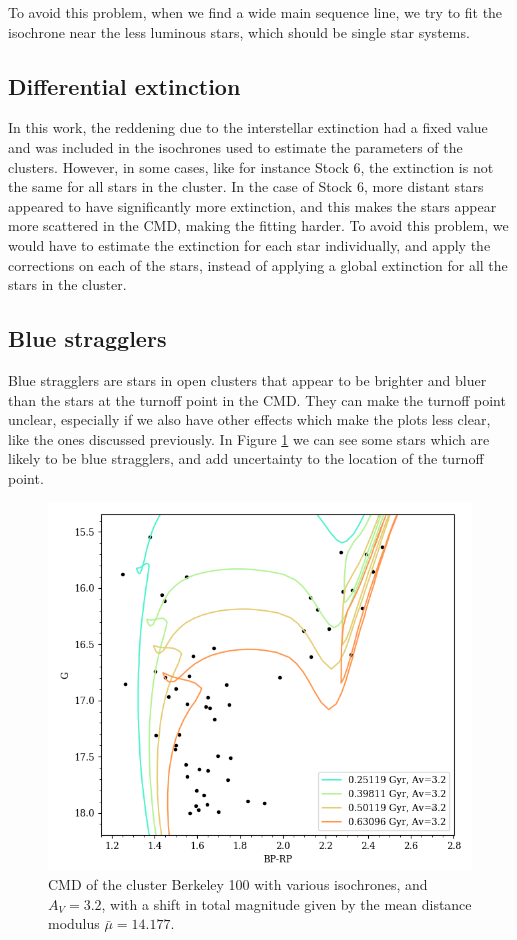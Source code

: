 \documentclass[twocolumn]{revtex4}
\begin{document}
To avoid this problem, when we find a wide main sequence line, we try to fit the isochrone near the less luminous stars, which should be single star systems.

\subsection{Differential extinction}
In this work, the reddening due to the interstellar extinction had a fixed value and was included in the isochrones used to estimate the parameters of the clusters. However, in some cases, like for instance Stock 6, the extinction is not the same for all stars in the cluster. In the case of Stock 6, more distant stars appeared to have significantly more extinction, and this makes the stars appear more scattered in the CMD, making the fitting harder. To avoid this problem, we would have to estimate the extinction for each star individually, and apply the corrections on each of the stars, instead of applying a global extinction for all the stars in the cluster.

\subsection{Blue stragglers}
Blue stragglers are stars in open clusters that appear to be brighter and bluer than the stars at the turnoff point in the CMD. They can make the turnoff point unclear, especially if we also have other effects which make the plots less clear, like the ones discussed previously. In Figure \ref{blue-stragglers} we can see some stars which are likely to be blue stragglers, and add uncertainty to the location of the turnoff point.

\begin{figure}[h!]
\centering
\includegraphics[scale=0.55]{berkeley-example}
\caption{CMD of the cluster Berkeley 100 with various isochrones, and $A_V = 3.2$, with a shift in total magnitude given by the mean distance modulus $\bar{\mu} = 14.177$.}
\label{blue-stragglers}
\end{figure}
\end{document}
